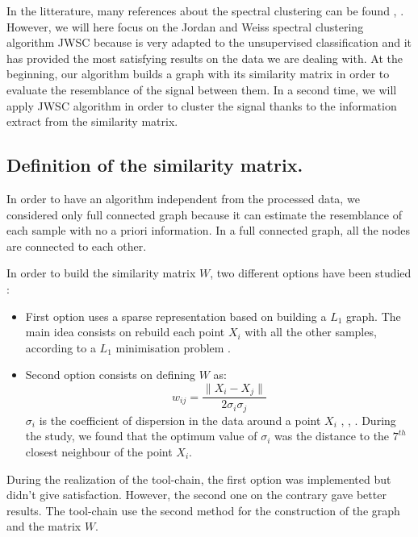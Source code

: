
In the litterature, many references about the spectral clustering can be found \cite{von2007tutorial}, \cite{mouysset2010contributions}. However, we will here focus on the Jordan and Weiss spectral clustering algorithm JWSC \cite{von2007tutorial} because is very adapted to the unsupervised classification and it has provided the most satisfying results on the data we are dealing with. At the beginning, our algorithm builds a graph with its similarity matrix in order to evaluate the resemblance of the signal between them. In a second time, we will apply JWSC algorithm in order to cluster the signal thanks to the information extract from the similarity matrix.


\subsection{Definition of the similarity matrix.}

In order to have an algorithm independent from the processed data, we considered only full connected graph because it can estimate the resemblance of each sample with no a priori information. In a full connected graph, all the nodes are connected to each other.

In order to build the similarity matrix $W$, two different options have been studied :

\begin{itemize}

\item First option uses a sparse representation based on building a $L_1$ graph. The main idea consists on rebuild each point $X_i$ with all the other samples, according to a $L_1$ minimisation problem \cite{yan2009semi}.

\item Second option consists on defining $W$ as:
\begin{equation}
w_{ij} = \frac{\|X_i-X_j\|}{2\sigma_i\sigma_j}
\end{equation}
$\sigma_i$ is the coefficient of dispersion in the data around a point $X_i$ , \cite{tartare2014contribution}, \cite{mouysset2010contributions}. During the study, we found that the optimum value of $\sigma_i$ was the distance to the $7^{th}$ closest neighbour of the point $X_i$.

\end{itemize}

During the realization of the tool-chain, the first option was implemented but didn't give satisfaction. However, the second one on the contrary gave better results. The tool-chain use the second method for the construction of the graph and the matrix $W$.


